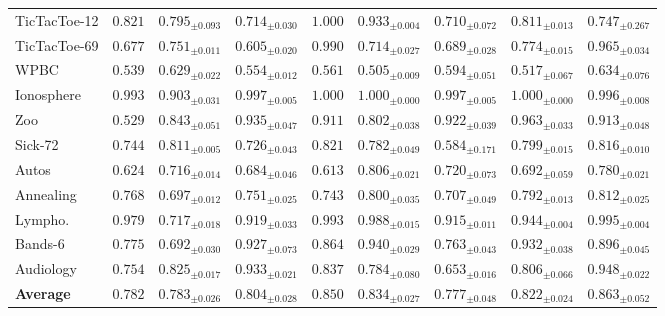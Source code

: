 \documentclass[times, review, 10pt]{elsarticle}
\begin{document}
\begin{table}[t]
{\begin{tabular}{lccccccc c}
TicTacToe-12 & $0.821$ & $0.795_{\pm0.093}$ & $0.714_{\pm0.030}$ & $\mathbf{1.000}$ & $0.933_{\pm0.004}$ & $0.710_{\pm0.072}$ & $0.811_{\pm0.013}$ & $0.747_{\pm0.267}$ \\
TicTacToe-69 & $0.677$ & $0.751_{\pm0.011}$ & $0.605_{\pm0.020}$ & $\mathbf{0.990}$ & $0.714_{\pm0.027}$ & $0.689_{\pm0.028}$ & $0.774_{\pm0.015}$ & $0.965_{\pm0.034}$ \\
WPBC         & $0.539$ & $0.629_{\pm0.022}$ & $0.554_{\pm0.012}$ & $0.561$ & $0.505_{\pm0.009}$ & $0.594_{\pm0.051}$ & $0.517_{\pm0.067}$ & $\mathbf{0.634}_{\pm0.076}$ \\
Ionosphere   & $0.993$ & $0.903_{\pm0.031}$ & $0.997_{\pm0.005}$ & $\mathbf{1.000}$ & $\mathbf{1.000}_{\pm0.000}$ & $0.997_{\pm0.005}$ & $\mathbf{1.000}_{\pm0.000}$ & $0.996_{\pm0.008}$ \\
Zoo          & $0.529$ & $0.843_{\pm0.051}$ & $0.935_{\pm0.047}$ & $0.911$ & $0.802_{\pm0.038}$ & $0.922_{\pm0.039}$ & $\mathbf{0.963}_{\pm0.033}$ & $0.913_{\pm0.048}$ \\
Sick-72      & $0.744$ & $0.811_{\pm0.005}$ & $0.726_{\pm0.043}$ & $\mathbf{0.821}$ & $0.782_{\pm0.049}$ & $0.584_{\pm0.171}$ & $0.799_{\pm0.015}$ & $0.816_{\pm0.010}$ \\
Autos        & $0.624$ & $0.716_{\pm0.014}$ & $0.684_{\pm0.046}$ & $0.613$ & $\mathbf{0.806}_{\pm0.021}$ & $0.720_{\pm0.073}$ & $0.692_{\pm0.059}$ & $0.780_{\pm0.021}$ \\
Annealing    & $0.768$ & $0.697_{\pm0.012}$ & $0.751_{\pm0.025}$ & $0.743$ & $0.800_{\pm0.035}$ & $0.707_{\pm0.049}$ & $0.792_{\pm0.013}$ & $\mathbf{0.812}_{\pm0.025}$ \\
Lympho.      & $0.979$ & $0.717_{\pm0.018}$ & $0.919_{\pm0.033}$ & $0.993$ & $0.988_{\pm0.015}$ & $0.915_{\pm0.011}$ & $0.944_{\pm0.004}$ & $\mathbf{0.995}_{\pm0.004}$ \\
Bands-6      & $0.775$ & $0.692_{\pm0.030}$ & $0.927_{\pm0.073}$ & $0.864$ & $\mathbf{0.940}_{\pm0.029}$ & $0.763_{\pm0.043}$ & $0.932_{\pm0.038}$ & $0.896_{\pm0.045}$ \\
Audiology    & $0.754$ & $0.825_{\pm0.017}$ & $0.933_{\pm0.021}$ & $0.837$ & $0.784_{\pm0.080}$ & $0.653_{\pm0.016}$ & $0.806_{\pm0.066}$ & $\mathbf{0.948}_{\pm0.022}$ \\
\midrule
\textbf{Average} & $0.782$ & $0.783_{\pm0.026}$ & $0.804_{\pm0.028}$ & $0.850$ & $0.834_{\pm0.027}$ & $0.777_{\pm0.048}$ & $0.822_{\pm0.024}$ & $\mathbf{0.863}_{\pm0.052}$ \\
\bottomrule
\end{tabular}
}
\end{table}
\end{document}
